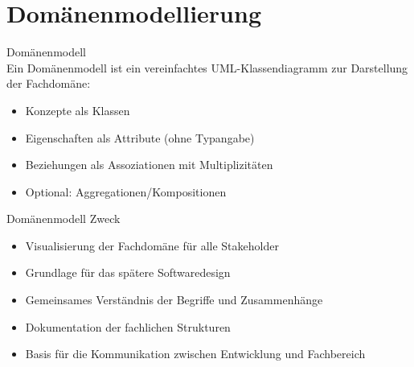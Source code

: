 \section{Domänenmodellierung}

\begin{definition}{Domänenmodell}\\
Ein Domänenmodell ist ein vereinfachtes UML-Klassendiagramm zur Darstellung der Fachdomäne:
\begin{itemize}
    \item Konzepte als Klassen
    \item Eigenschaften als Attribute (ohne Typangabe)
    \item Beziehungen als Assoziationen mit Multiplizitäten
    \item Optional: Aggregationen/Kompositionen
\end{itemize}
\end{definition}

\begin{concept}{Domänenmodell Zweck}
\begin{itemize}
    \item Visualisierung der Fachdomäne für alle Stakeholder
    \item Grundlage für das spätere Softwaredesign
    \item Gemeinsames Verständnis der Begriffe und Zusammenhänge
    \item Dokumentation der fachlichen Strukturen
    \item Basis für die Kommunikation zwischen Entwicklung und Fachbereich
\end{itemize}
\end{concept}

